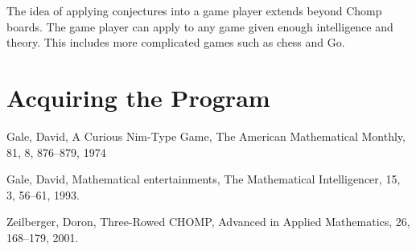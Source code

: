 \documentclass{amsart}
\theoremstyle{definition}
\theoremstyle{remark}
\numberwithin{equation}{section}
\begin{document}






The idea of applying conjectures into a game player extends beyond Chomp boards.  The game player can apply to any game given enough intelligence and theory.  This includes more complicated games such as chess and Go.









\section{Acquiring the Program}






\begin{thebibliography}{99}
Gale, David,
A Curious Nim-Type Game,
The American Mathematical Monthly, 81, 8, 876--879, 1974

Gale, David,
Mathematical entertainments,
The Mathematical Intelligencer, 15, 3, 56--61, 1993.

Zeilberger, Doron, 
Three-Rowed CHOMP,
Advanced in Applied Mathematics, 26, 168--179, 2001.


\end{thebibliography}
\end{document}
